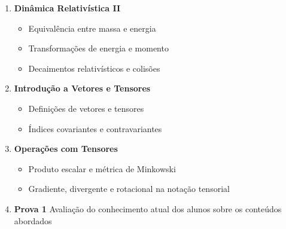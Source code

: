 \documentclass[a4paper,12pt]{article}
\begin{document}
\begin{enumerate}
\begin{itemize}
		      \item Quadrivetores e equações de movimento
		      \item Energia e momento relativísticos
	      \end{itemize}
	\item \textbf{Dinâmica Relativística II}
	      \begin{itemize}
		      \item Equivalência entre massa e energia
		      \item Transformações de energia e momento
		      \item Decaimentos relativísticos e colisões
	      \end{itemize}
	\item \textbf{Introdução a Vetores e Tensores}
	      \begin{itemize}
		      \item Definições de vetores e tensores
		      \item Índices covariantes e contravariantes
	      \end{itemize}
	\item \textbf{Operações com Tensores}
	      \begin{itemize}
		      \item Produto escalar e métrica de Minkowski
		      \item Gradiente, divergente e rotacional na notação tensorial
	      \end{itemize}
	\item \textbf{Prova 1} Avaliação do conhecimento atual dos alunos sobre os conteúdos
	      abordados
\end{enumerate}
\end{document}
